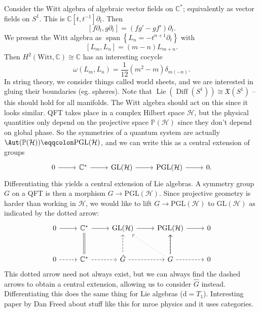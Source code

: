 \begin{example}
	Consider the Witt algebra of algebraic vector fields on $\mathbb{C} ^*$; equivalently as vector fields on $S^1$. This is $\mathbb{C} [t,t^{-1} ]\partial _t$. Then
	\[
		[f\partial_t,g\partial_t]=(fg'-gf')\partial _t
	.\]
	We present the Witt algebra as $\operatorname{span} \left\{ L_n = -t^{n+1} \partial _t \right\} $ with
	\[
		[L_m,L_n]=(m-n)L_{m+n} 
	.\]
	Then $H^2(\mathrm{Witt} ,\mathbb{C} )\cong \mathbb{C} $ has an interesting cocycle
	\[
		\omega (L_m,L_n)=\frac{1}{12} (m^2-m)\delta _{m(-n)} 
	.\]
	In string theory, we consider things called world sheets, and we are interested in gluing their boundaries (eg. spheres). Note that $\operatorname{Lie} (\operatorname{Diff } (S^1))\cong \mathfrak{X} (S^1)$ -- this should hold for all manifolds. The Witt algebra should act on this since it looks similar. QFT takes place in a complex Hilbert space $\mathcal{H} $, but the physical quantities only depend on the projective space $\mathbb{P} (\mathcal{H} )$ since they don't depend on global phase. So the symmetries of a quantum system are actually $\Aut(\mathbb{P} (\mathcal{H} )) \eqqcolon \mathrm{PGL} (\mathcal{H} )$, and we can write this as a central extension of groups
	\[\begin{tikzcd}[row sep = 2.5em, column sep = 2.5em]
	0\ar[r]  & \mathbb{C} ^*\ar[r]  & \operatorname{GL} (\mathcal{H} ) \ar[r] & \mathrm{PGL} (\mathcal{H} )\ar[r]  & 0.
	\end{tikzcd}\]
	Differentiating this yields a central extension of Lie algebras. A symmetry group $G$ on a QFT is then a morphism $G\to \mathrm{PGL} (\mathcal{H} )$. Since projective geometry is harder than working in $\mathcal{H} $, we would like to lift $G\to \mathrm{PGL} (\mathcal{H} )$ to $\mathrm{GL} (\mathcal{H} )$ as indicated by the dotted arrow:
	\[\begin{tikzcd}[row sep = 2.5em, column sep = 2.5em]
	0\ar[r]  & \mathbb{C} ^*\ar[r]  & \mathrm{GL} (\mathcal{H} )\ar[r]  & \mathrm{PGL} (\mathcal{H} )\ar[r]  & 0 \\
	0\ar[dashed, r]  & \mathbb{C} ^*\ar[dashed, r] \ar[equals, u]  & \hat{G} \ar[dashed, u] \ar[dashed, r]  & G\ar[u] \ar[dotted, ul] \ar[dashed, u] \ar[dashed, r]  & 0
	\end{tikzcd}\]
	This dotted arrow need not always exist, but we can always find the dashed arrows to obtain a central extension, allowing us to consider $\hat{G} $ instead. Differentiating this does the same thing for Lie algebras ($\mathrm{d} =T_1$). Interesting paper by Dan Freed about stuff like this for mroe physics and it uses categories.
\end{example}

